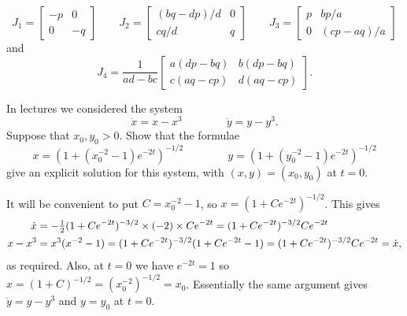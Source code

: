 \documentclass[a4paper]{amsart}
\begin{document}
\begin{solution}
 \[ J_1 = \left[\begin{array}{cc} -p & 0 \\ 0 & -q \end{array}\right] \qquad
    J_2 = \left[\begin{array}{cc} (bq-dp)/d & 0 \\ cq/d & q \end{array}\right] \qquad
    J_3 = \left[\begin{array}{cc} p & bp/a \\ 0 & (cp-aq)/a \end{array}\right]
 \]
 and
 \[ J_4 = \frac{1}{ad-bc} \left[\begin{array}{cc} a(dp-bq) & b(dp-bq) \\
                               c(aq-cp) & d(aq-cp) \end{array}\right].
 \]
\end{solution}

\begin{exercise}\label{ex-gradient-flow}
 In lectures we considered the system
 \[ \dot{x} = x-x^3 \hspace{4em} \dot{y} = y-y^3. \]
 Suppose that $x_0,y_0>0$.  Show that the formulae
 \[ x = (1+(x_0^{-2}-1)e^{-2t})^{-1/2} \hspace{4em}
    y = (1+(y_0^{-2}-1)e^{-2t})^{-1/2}
 \]
 give an explicit solution for this system, with $(x,y)=(x_0,y_0)$ at
 $t=0$. 
\end{exercise}
\begin{solution}
 It will be convenient to put $C=x_0^{-2}-1$, so
 $x=(1+Ce^{-2t})^{-1/2}$.  This gives 
 \begin{align*}
  \dot{x} &= -\tfrac{1}{2}(1+Ce^{-2t})^{-3/2}\times(-2)\times
              Ce^{-2t} 
           = (1+Ce^{-2t})^{-3/2}C e^{-2t} \\
  x-x^3 &= x^3(x^{-2}-1)
         = (1+Ce^{-2t})^{-3/2}(1+Ce^{-2t}-1) 
         = (1+Ce^{-2t})^{-3/2}C e^{-2t} = \dot{x},
 \end{align*}
 as required.  Also, at $t=0$ we have $e^{-2t}=1$ so
 $x=(1+C)^{-1/2}=(x_0^{-2})^{-1/2}=x_0$.  Essentially the same
 argument gives $\dot{y}=y-y^3$ and $y=y_0$ at $t=0$.
\end{solution}
\end{document}
